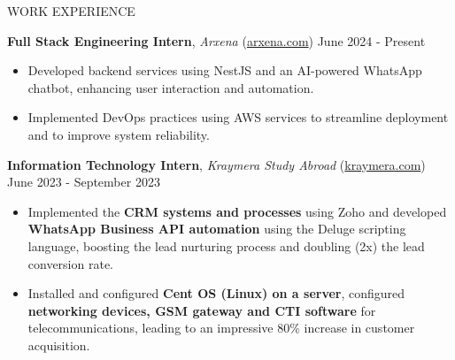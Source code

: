 \documentclass{resume} %
\begin{document}
\begin{rSection}{WORK EXPERIENCE}

    \textbf{Full Stack Engineering Intern}, \textit{Arxena} (\href{https://arxena.com}{arxena.com})  \hfill June 2024 - Present

    \begin{itemize}
        \itemsep -6pt {}
        \item Developed backend services using NestJS and an AI-powered WhatsApp chatbot, enhancing user interaction and automation.
        \item  Implemented DevOps practices using AWS services to streamline deployment and to improve system reliability.
    \end{itemize}

    \textbf{Information Technology Intern}, \textit{Kraymera Study Abroad} (\href{https://kraymera.com}{kraymera.com})  \hfill June 2023 - September 2023

    \begin{itemize}
        \itemsep -6pt {}
        \item Implemented the \textbf{CRM systems and processes} using Zoho and developed \textbf{WhatsApp Business API automation} using the Deluge scripting language, boosting the lead nurturing process and doubling (2x) the lead conversion rate.
        \item Installed and configured \textbf{Cent OS (Linux) on a server}, configured \textbf{networking devices, GSM gateway and CTI software} for telecommunications, leading to an impressive 80\% increase in customer acquisition.
    \end{itemize}
\end{rSection}



\end{document}
